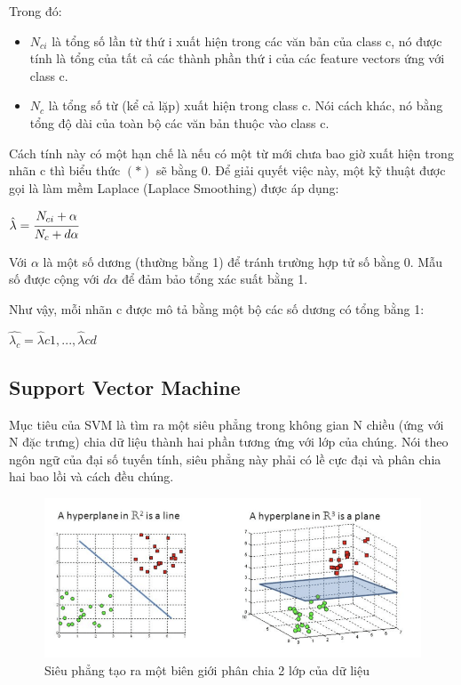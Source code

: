 \documentclass[12pt,a4paper,oneside]{book}
\begin{document}
			Trong đó:
			
			\begin{itemize}
				\item $N_{ci}$ là tổng số lần từ thứ i xuất hiện trong các văn bản của class c, nó được tính là tổng của tất cả các thành phần thứ i của các feature vectors ứng với class c.
				\item $N_c$ là tổng số từ (kể cả lặp) xuất hiện trong class c. Nói cách khác, nó bằng tổng độ dài của toàn bộ các văn bản thuộc vào class c.
			\end{itemize}
			
			Cách tính này có một hạn chế là nếu có một từ mới chưa bao giờ xuất hiện trong nhãn c thì biểu thức $(*)$ sẽ bằng 0. Để giải quyết việc này, một kỹ thuật được gọi là làm mềm Laplace (Laplace Smoothing) được áp dụng:
			
			\begin{center}
				$\hat{\lambda}=\cfrac{N_{ci}+\alpha}{N_c+d\alpha}$
			\end{center}
			
			Với $\alpha$ là một số dương (thường bằng 1) để tránh trường hợp tử số bằng 0. Mẫu số được cộng với $d\alpha$ để đảm bảo tổng xác suất bằng 1.
			
			Như vậy, mỗi nhãn c được mô tả bằng một bộ các số dương có tổng bằng 1:
			
			\begin{center}
				$\hat{\lambda_c}=\hat{\lambda}c1,..., \hat{\lambda}cd$
			\end{center}

		\subsection{Support Vector Machine}
		Mục tiêu của SVM là tìm ra một siêu phẳng trong không gian N chiều (ứng với N đặc trưng) chia dữ liệu thành hai phần tương ứng với lớp của chúng. Nói theo ngôn ngữ của đại số tuyến tính, siêu phẳng này phải có lề cực đại và phân chia hai bao lồi và cách đều chúng.
		
			\begin{figure}[H]
			\begin{center}
		\includegraphics[width=0.68\columnwidth]{SVM_hyperplane}
			\end{center}
		\caption{Siêu phẳng tạo ra một biên giới phân chia 2 lớp của dữ liệu}
			\end{figure}		
		
\end{document}
